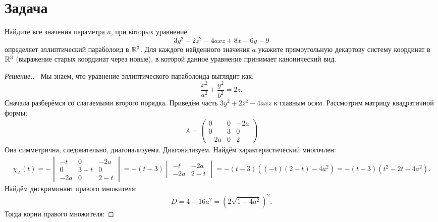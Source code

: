 \documentclass[a4paper]{article}
\theoremstyle{remark}
\begin{document}
    \section*{Задача }
        Найдите все значения параметра $a$, при которых уравнение 
        $$ 
        3y^2 + 2z^2 -4axz + 8x - 6y - 9
        $$
        определяет эллиптический параболоид в $\mathbb{R}^3$. Для каждого найденного значения  $a$
        укажите прямоугольную декартову систему координат в $\mathbb{R}^3$ (выражение старых координат 
        через новые), в которой данное уравнение принимает канонический вид. 
        \begin{proof}[Решение.] \ 
          Мы знаем, что уравнение эллиптического параболоида выглядит как:
          \begin{equation*}
            \frac{x^2}{a^2} + \frac{y^2}{b^2} = 2z.
          \end{equation*}
          Сначала разберёмся со слагаемыми второго порядка. Приведём часть $3y^2 + 2z^2 - 4axz$ к главным осям.
          Рассмотрим матрицу квадратичной формы:
        \begin{align*}
          A = \begin{pmatrix}
            0 & 0 & -2a \\
            0 & 3 & 0 \\
            -2a & 0 & 2
          \end{pmatrix}
        \end{align*}
        Она симметрична, следовательно, диагонализуема. Диагонализуем. Найдём характеристический многочлен:
        \begin{align*}
          \chi_A(t) = -\begin{vmatrix}
            -t & 0 & -2a \\
            0 & 3 - t & 0 \\
            -2a & 0 & 2 - t
          \end{vmatrix} = -(t - 3) \begin{vmatrix}
            -t & -2a \\
            -2a & 2 - t
          \end{vmatrix} = -(t - 3)((-t)(2 - t) - 4a^2) = - (t - 3)(t^2 - 2t - 4a^2).
        \end{align*}
        Найдём дискриминант правого множителя:
        \begin{equation*}
          D = 4 + 16a^2 = \left( 2\sqrt{1 + 4a^2} \right)^2.
        \end{equation*}
        Тогда корни правого множителя:

\end{proof}
\end{document}
